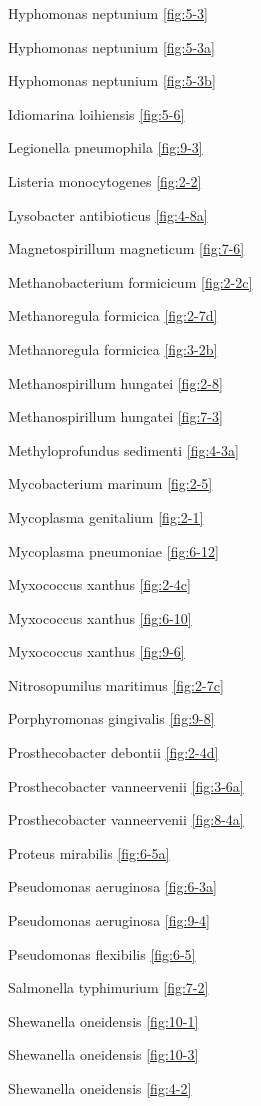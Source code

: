 \documentclass[]{tufte-book}
\begin{document}
Hyphomonas neptunium \ref{fig:5-3}

Hyphomonas neptunium \ref{fig:5-3a}

Hyphomonas neptunium \ref{fig:5-3b}

Idiomarina loihiensis \ref{fig:5-6}

Legionella pneumophila \ref{fig:9-3}

Listeria monocytogenes \ref{fig:2-2}

Lysobacter antibioticus \ref{fig:4-8a}

Magnetospirillum magneticum \ref{fig:7-6}

Methanobacterium formicicum \ref{fig:2-2c}

Methanoregula formicica \ref{fig:2-7d}

Methanoregula formicica \ref{fig:3-2b}

Methanospirillum hungatei \ref{fig:2-8}

Methanospirillum hungatei \ref{fig:7-3}

Methyloprofundus sedimenti \ref{fig:4-3a}

Mycobacterium marinum \ref{fig:2-5}

Mycoplasma genitalium \ref{fig:2-1}

Mycoplasma pneumoniae \ref{fig:6-12}

Myxococcus xanthus \ref{fig:2-4c}

Myxococcus xanthus \ref{fig:6-10}

Myxococcus xanthus \ref{fig:9-6}

Nitrosopumilus maritimus \ref{fig:2-7c}

Porphyromonas gingivalis \ref{fig:9-8}

Prosthecobacter debontii \ref{fig:2-4d}

Prosthecobacter vanneervenii \ref{fig:3-6a}

Prosthecobacter vanneervenii \ref{fig:8-4a}

Proteus mirabilis \ref{fig:6-5a}

Pseudomonas aeruginosa \ref{fig:6-3a}

Pseudomonas aeruginosa \ref{fig:9-4}

Pseudomonas flexibilis \ref{fig:6-5}

Salmonella typhimurium \ref{fig:7-2}

Shewanella oneidensis \ref{fig:10-1}

Shewanella oneidensis \ref{fig:10-3}

Shewanella oneidensis \ref{fig:4-2}
\end{document}

